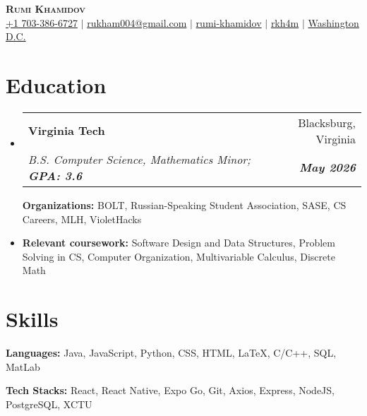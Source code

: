 \documentclass[letterpaper, 10pt]{article}
\makeatletter
\newcommand{\resumeItem}[1]{
  \item\small{
    {#1 \vspace{-2pt}}
  }
}
\newcommand{\resumeEducationHeading}[6]{
  \vspace{-2pt}\item
    \begin{tabular*}{0.97\textwidth}[t]{l@{\extracolsep{\fill}}r}
      \textbf{#1} & #2 \\
      \textit{\small#3} & \textit{\small #4} \\
    \end{tabular*}\vspace{-5pt}
}
\newcommand{\resumeSubHeadingListStart}{\begin{itemize}[leftmargin=0.15in, label={}]}
\newcommand{\resumeSubHeadingListEnd}{\end{itemize}}
\newcommand{\resumeItemListStart}{\begin{itemize}}
\newcommand{\resumeItemListEnd}{\end{itemize}\vspace{-5pt}}
\makeatother
\begin{document}

\begin{center}
    \textbf{\Huge \scshape Rumi Khamidov} \\ \vspace{3pt}
    \small
    \faMobile \hspace{.5pt} \href{tel:7033866727}{+1 703-386-6727}
    $|$
    \faAt \hspace{.5pt} \href{mailto:rukham004@gmail.com}{rukham004@gmail.com}
    $|$
    \faLinkedinSquare \hspace{.5pt} \href{https://www.linkedin.com/in/rumi-khamidov-22b622290/}{rumi-khamidov}
    $|$
    \faGithub \hspace{.5pt} \href{https://github.com/rkh4m}{rkh4m}
    $|$
    \faMapMarker \hspace{.5pt} \href{https://maps.app.goo.gl/aoi52DAKhQkgQ1MT8}{Washington D.C.}
\end{center}



\section{Education}
  \vspace{3pt}
  \resumeSubHeadingListStart
    
    \resumeEducationHeading
      {Virginia Tech
      }{Blacksburg, Virginia}
      {B.S. Computer Science, Mathematics Minor; \textbf{GPA: 3.6}}{\textbf{May 2026}}

        \resumeItemListStart
	   \resumeItem{\textbf{Organizations:} BOLT, Russian-Speaking Student Association, SASE, CS Careers, MLH, VioletHacks}
             \resumeItem{\textbf{Relevant coursework:} Software Design and Data Structures, Problem Solving in CS, Computer Organization, Multivariable Calculus, Discrete Math}
         \resumeItemListEnd


\section{Skills}
  \vspace{2pt}
  \resumeSubHeadingListStart
    \small{\item{
        \textbf{Languages:}{ Java, JavaScript, Python, CSS, HTML, LaTeX, C/C++, SQL, MatLab } \\ \vspace{3pt}
                
        \textbf{Tech Stacks:}{ React, React Native, Expo Go, Git, Axios, Express, NodeJS, PostgreSQL, XCTU } \\ \vspace{3pt}
    }}
  \resumeSubHeadingListEnd
\end{document}
